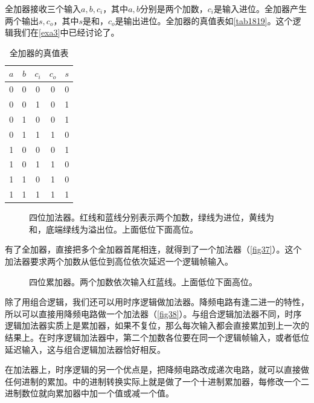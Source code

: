 全加器接收三个输入$a,b,c_i$，其中$a,b$分别是两个加数，$c_i$是输入进位。全加器产生两个输出$s,c_o$，其中$s$是和，$c_o$是输出进位。全加器的真值表如\autoref{tab1819}。这个逻辑我们在\autoref{exa3}中已经讨论了。

\begin{table}[!ht]
  \centering
  \begin{tabular}{ccc|cc}
    $a$ & $b$ & $c_i$ & $c_o$ & $s$ \\\hline
    0   & 0   & 0     & 0     & 0 \\
    0   & 0   & 1     & 0     & 1 \\
    0   & 1   & 0     & 0     & 1 \\
    0   & 1   & 1     & 1     & 0 \\
    1   & 0   & 0     & 0     & 1 \\
    1   & 0   & 1     & 1     & 0 \\
    1   & 1   & 0     & 1     & 0 \\
    1   & 1   & 1     & 1     & 1
  \end{tabular}
  \caption{全加器的真值表}\label{tab1819}
\end{table}

\begin{figure}[!ht]
  \centering
  \caption{四位加法器。红线和蓝线分别表示两个加数，绿线为进位，黄线为和，底端绿线为溢出位。上面低位下面高位。}\label{fig37}
\end{figure}

有了全加器，直接把多个全加器首尾相连，就得到了一个加法器（\autoref{fig37}）。这个加法器要求两个加数从低位到高位依次延迟一个逻辑帧输入。

\begin{figure}[!ht]
  \centering
  \caption{四位累加器。两个加数依次输入红蓝线。上面低位下面高位。}\label{fig38}
\end{figure}

除了用组合逻辑，我们还可以用时序逻辑做加法器。降频电路有逢二进一的特性，所以可以直接用降频电路做一个加法器（\autoref{fig38}）。与组合逻辑加法器不同，时序逻辑加法器实质上是累加器，如果不复位，那么每次输入都会直接累加到上一次的结果上。在时序逻辑加法器中，第二个加数各位要在同一个逻辑帧输入，或者低位延迟输入，这与组合逻辑加法器恰好相反。

在加法器上，时序逻辑的另一个优点是，把降频电路改成递次电路，就可以直接做任何进制的累加。中的进制转换实际上就是做了一个十进制累加器，每修改一个二进制数位就向累加器中加一个值或减一个值。

